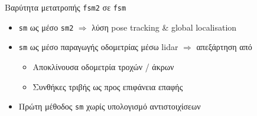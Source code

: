 \begin{frame}{Βαρύτητα μετατροπής \texttt{fsm2} σε \texttt{fsm}}

  \begin{itemize}
    \item \texttt{sm} ως μέσο \texttt{sm2} $\Rightarrow$ λύση pose tracking \& global localisation
    \item \texttt{sm} ως μέσο παραγωγής οδομετρίας μέσω lidar $\Rightarrow$ απεξάρτηση από
    \begin{itemize}
      \item Αποκλίνουσα οδομετρία τροχών / άκρων
      \item Συνθήκες τριβής ως προς επιφάνεια επαφής
    \end{itemize}
    \item Πρώτη μέθοδος \texttt{sm} χωρίς υπολογισμό αντιστοιχίσεων
  \end{itemize}


\end{frame}
